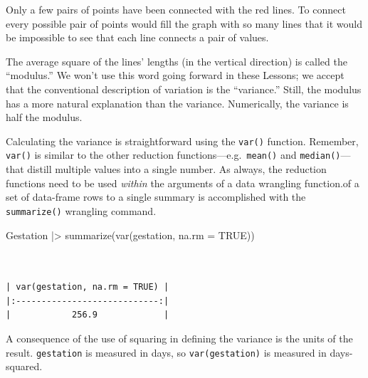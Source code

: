 \documentclass[
  letterpaper,
  DIV=11,
  numbers=noendperiod,
  oneside]{scrartcl}
\newenvironment{Shaded}{\begin{snugshade}}{\end{snugshade}}
\newcommand{\AttributeTok}[1]{\textcolor[rgb]{0.40,0.45,0.13}{#1}}
\newcommand{\ConstantTok}[1]{\textcolor[rgb]{0.56,0.35,0.01}{#1}}
\newcommand{\FunctionTok}[1]{\textcolor[rgb]{0.28,0.35,0.67}{#1}}
\newcommand{\NormalTok}[1]{\textcolor[rgb]{0.00,0.23,0.31}{#1}}
\newcommand{\SpecialCharTok}[1]{\textcolor[rgb]{0.37,0.37,0.37}{#1}}
\begin{document}
\begin{tcolorbox}
\begin{figure}[H]
{}

\end{figure}%

Only a few pairs of points have been connected with the red lines. To
connect every possible pair of points would fill the graph with so many
lines that it would be impossible to see that each line connects a pair
of values.

The average square of the lines' lengths (in the vertical direction) is
called the ``modulus.'' We won't use this word going forward in these
Lessons; we accept that the conventional description of variation is the
``variance.'' Still, the modulus has a more natural explanation than the
variance. Numerically, the variance is half the modulus.

\end{tcolorbox}

Calculating the variance is straightforward using the \texttt{var()}
function. Remember, \texttt{var()} is similar to the other reduction
functions---e.g.~\texttt{mean()} and \texttt{median()}---that distill
multiple values into a single number. As always, the reduction functions
need to be used \emph{within} the arguments of a data wrangling
function.of a set of data-frame rows to a single summary is accomplished
with the \texttt{summarize()} wrangling command.

\begin{Shaded}
\begin{Highlighting}[]
\NormalTok{Gestation }\SpecialCharTok{|\textgreater{}}
  \FunctionTok{summarize}\NormalTok{(}\FunctionTok{var}\NormalTok{(gestation, }\AttributeTok{na.rm =} \ConstantTok{TRUE}\NormalTok{))}
\end{Highlighting}
\end{Shaded}

\begin{verbatim}


| var(gestation, na.rm = TRUE) |
|:----------------------------:|
|            256.9             |
\end{verbatim}

A consequence of the use of squaring in defining the variance is the
units of the result. \texttt{gestation} is measured in days, so
\texttt{var(gestation)} is measured in days-squared.
\end{document}
